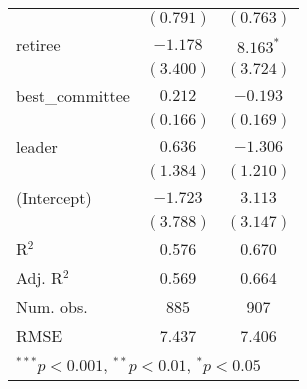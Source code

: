 \documentclass[12pt]{article}
\begin{document}
\begin{table}
\begin{center}
\begin{tabular}{l c c }
			& $(0.791)$      & $(0.763)$      \\
			retiree                  & $-1.178$       & $8.163^{*}$    \\
			& $(3.400)$      & $(3.724)$      \\
			best\_committee          & $0.212$        & $-0.193$       \\
			& $(0.166)$      & $(0.169)$      \\
			leader                   & $0.636$        & $-1.306$       \\
			& $(1.384)$      & $(1.210)$      \\
			(Intercept)              & $-1.723$       & $3.113$        \\
			& $(3.788)$      & $(3.147)$      \\
			\hline
			R$^2$                    & 0.576          & 0.670          \\
			Adj. R$^2$               & 0.569          & 0.664          \\
			Num. obs.                & 885            & 907            \\
			RMSE                     & 7.437          & 7.406          \\
			\hline
			\multicolumn{3}{l}{\scriptsize{$^{***}p<0.001$, $^{**}p<0.01$, $^*p<0.05$}}
		\end{tabular}
	\end{center}
\end{table}
\end{document}
